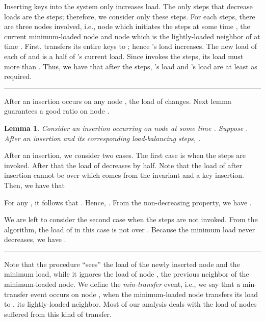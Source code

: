 \documentclass[a4paper]{article}
\newtheorem{lemma}{Lemma}
\newenvironment{proof}{{\bf Proof:}}{\hfill\rule{1.5mm}{3mm}\vspace{0.1in}}
\newcommand{\qed}{}
\begin{document}
\begin{proof}
  Inserting keys into the system only increases load.  The only steps
  that decrease loads are the  {\minbalance} steps; therefore, we
  consider only these steps.  For each {\minbalance} steps, there are
  three nodes involved, i.e., node  which initiates the 
  {\minbalance} steps at some time , the current minimum-loaded
  node  and node  which is the lightly-loaded neighbor of  at
  time .  First,  transfers its entire keys to ; hence 's
  load increases.  The new load of each of  and  is a half of
  's current load.  Since  invokes the  {\minbalance} steps, its
  load must more than .  Thus, we
  have that after the steps, 's load and 's load are at least 
  as required. \qed
\end{proof}

After an insertion occurs on any node , the load of   changes.
Next lemma guarantees a good ratio on node .

\begin{lemma}
\label{lem:insert-property} 
Consider an insertion occurring on node  at some time .  Suppose
. After an insertion and its corresponding
load-balancing steps, .
\end{lemma}

\begin{proof}
  After an insertion, we consider two cases.  The first case is when the
  {\minbalance} steps are invoked. After that the load of  decreases by half. 
  Note that the load of  after insertion cannot be over
   which comes from the invariant and a key
  insertion. Then, we have that
    
  For any , it follows that . 
  Hence, .
  From the non-decreasing property, we have .
  
  We are left to consider the second case when the {\minbalance} steps
  are not invoked.  From the algorithm, the load of  in this case
  is not over .  Because the minimum load never
  decreases, we have .
\end{proof}

Note that the {\minbalance} procedure ``sees'' the load of the newly inserted node
and the minimum load, while it ignores the load of node , the
previous neighbor of the minimum-loaded node. We define the
{\em min-transfer} event, i.e., we say that a min-transfer event occurs
on node , when the minimum-loaded node transfers its load to ,
its lightly-loaded neighbor. Most of our analysis deals with the load
of nodes suffered from this kind of transfer.
\end{document}
